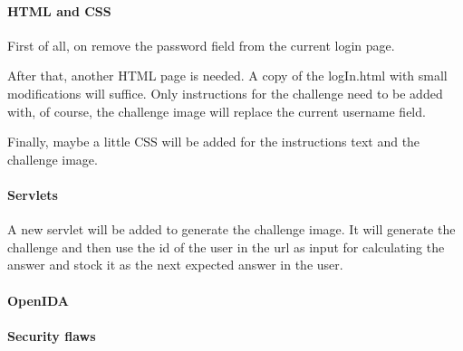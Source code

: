 \documentclass[11pt,a4paper]{article}
\begin{document}
\paragraph{HTML and CSS}
First of all, on remove the password field from the current login page.

After that, another HTML page is needed. A copy of the logIn.html with small modifications will suffice. Only
instructions for the challenge need to be added with, of course, the challenge image will replace the current username
field.

Finally, maybe a little CSS will be added for the instructions text and the challenge image.

\paragraph{Servlets}
A new servlet will be added to generate the challenge image. It will generate the challenge and then use the id of the user in the url as input for
calculating the answer and stock it as the next expected answer in the user.

\paragraph{OpenIDA}

\paragraph{Security flaws}
\end{document}
